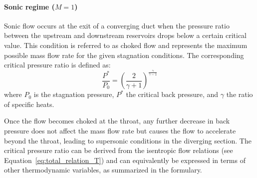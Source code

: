 	\paragraph{Sonic regime ($M = 1$)}
		Sonic flow occurs at the exit of a converging duct when the pressure ratio between the upstream and downstream reservoirs drops below a certain critical value. 
		This condition is referred to as choked flow and represents the maximum possible mass flow rate for the given stagnation conditions. 
		The corresponding critical pressure ratio is defined as:
		\begin{equation}
			\frac{P^*}{P_0}=\left(\frac{2}{\gamma + 1}\right)^{\frac{\gamma}{\gamma - 1}}
			\label{eq:critical-pressure}
		\end{equation}
		where $P_0$ is the stagnation pressure, $P^*$ the critical back pressure, and $\gamma$ the ratio of specific heats.

		Once the flow becomes choked at the throat, any further decrease in back pressure does not affect the mass flow rate but causes the flow to accelerate beyond the throat, leading to supersonic conditions in the diverging section. 
		The critical pressure ratio can be derived from the isentropic flow relations (see Equation~\eqref{eq:total_relation_T}) and can equivalently be expressed in terms of other thermodynamic variables, as summarized in the formulary.

